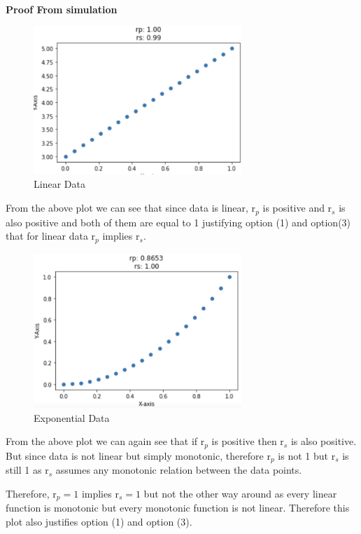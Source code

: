 \documentclass[12pt]{article}
\begin{document}
\noindent \textbf{Proof From simulation}
\begin{figure}[h]
    \centering
    \includegraphics[width=0.7\textwidth]{c3.png}
    \caption{Linear Data}
    \label{fig:c3}
\end{figure}

\vspace{3mm}
\noindent From the above plot we can see that since data is linear, r$_p$ is positive and r$_s$ is also positive and both of them are equal to 1 justifying option (1) and option(3) that for linear data r$_p$ implies r$_s$.
\clearpage

\begin{figure}[h]
    \centering
    \includegraphics[width=0.7\textwidth]{c4.png}
    \caption{Exponential Data}
    \label{fig:c4}
\end{figure}

\vspace{3mm}

\noindent From the above plot we can again see that if r$_p$ is positive then r$_s$ is also positive. But since data is not linear but simply monotonic, therefore r$_p$ is not 1 but r$_s$ is still 1 as r$_s$ assumes any monotonic relation between the data points.

\vspace{3mm}
\noindent Therefore, r$_p = 1$ implies r$_s = 1$ but not the other way around as every linear function is monotonic but every monotonic function is not linear. Therefore this plot also justifies option (1) and option (3).  
\end{document}
